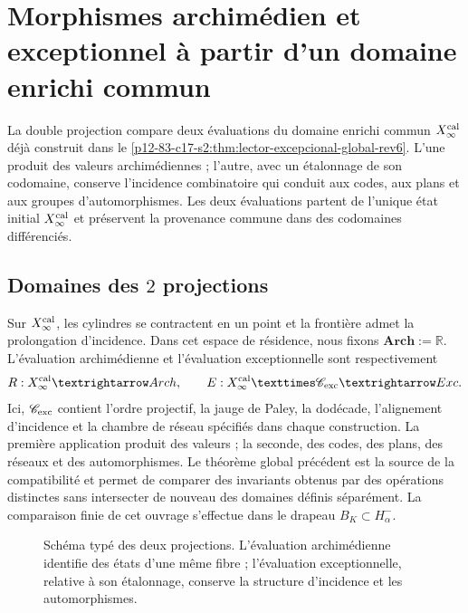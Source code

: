 \label{chap:83-17}

\section{Morphismes archimédien et exceptionnel à partir d'un domaine enrichi commun}
\label{p12-83-c17-s1:chap:doble}

La double projection compare deux évaluations du domaine enrichi commun
\(X_\infty^{\rm cal}\) déjà construit dans le
\cref{p12-83-c17-s2:thm:lector-excepcional-global-rev6}. L'une produit des valeurs
archimédiennes ; l'autre, avec un étalonnage de son codomaine, conserve
l'incidence combinatoire qui conduit aux codes, aux plans et aux groupes
d'automorphismes. Les deux évaluations partent de l'unique état initial
\(X_\infty^{\rm cal}\) et préservent la provenance commune dans des codomaines
différenciés.

\subsection{Domaines des \(2\) projections}

Sur \(X_\infty^{\rm cal}\), les cylindres se contractent en un point et la
frontière admet la prolongation d'incidence. Dans cet espace de résidence, nous fixons
\(\mathbf{Arch}:=\mathbb R\). L'évaluation archimédienne et l'évaluation
exceptionnelle sont respectivement
\[
\mathfrak R:X_\infty^{\rm cal}\longrightarrow\mathbf{Arch},
\qquad
\mathfrak E:X_\infty^{\rm cal}\times\mathscr C_{\rm exc}
\longrightarrow\mathbf{Exc}.
\]
Ici, \(\mathscr C_{\rm exc}\) contient l'ordre projectif, la jauge de
Paley, la dodécade, l'alignement d'incidence et la chambre de réseau
spécifiés dans chaque construction. La première application produit des valeurs ; la
seconde, des codes, des plans, des réseaux et des automorphismes. Le théorème global
précédent est la source de la compatibilité et permet de comparer
des invariants obtenus par des opérations distinctes sans intersecter de nouveau
des domaines définis séparément. La comparaison finie de cet ouvrage
s'effectue dans le drapeau
\(B_K\subset H^-_\alpha\).

\begin{figure}[H]
\centering
\resizebox{\textwidth}{!}{}
\caption{Schéma typé des deux projections. L'évaluation archimédienne
identifie des états d'une même fibre ; l'évaluation exceptionnelle, relative
à son étalonnage, conserve la structure d'incidence et les automorphismes.}
\label{p12-83-c17-s1:fig:doble-proyeccion}
\end{figure}

